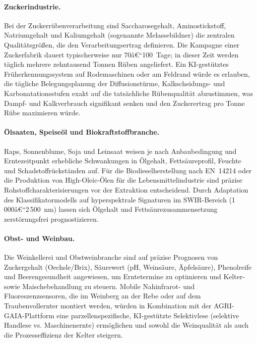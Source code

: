 ﻿\documentclass[12pt,a4paper]{article}
\theoremstyle{plain}
\theoremstyle{definition}
\begin{document}
	\paragraph{Zuckerindustrie.}
	Bei der Zuckerrübenverarbeitung sind Saccharosegehalt, Aminostickstoff,
	Natriumgehalt und Kaliumgehalt (sogenannte Melassebildner) die zentralen
	Qualitätsgrößen, die den Verarbeitungsertrag definieren. Die Kampagne einer
	Zuckerfabrik dauert typischerweise nur 70â€“100~Tage; in dieser Zeit werden
	täglich mehrere zehntausend Tonnen Rüben angeliefert. Ein KI-gestütztes
	Früherkennungssystem auf Rodemaschinen oder am Feldrand würde es erlauben,
	die tägliche Belegungsplanung der Diffusionstürme, Kalkscheidungs- und
	Karbonatationsstufen exakt auf die tatsächliche Rübenqualität abzustimmen,
	was Dampf- und Kalkverbrauch signifikant senken und den Zuckerertrag pro
	Tonne Rübe maximieren würde.

	\paragraph{Ölsaaten, Speiseöl und Biokraftstoffbranche.}
	Raps, Sonnenblume, Soja und Leinsaat weisen je nach Anbaubedingung und
	Erntezeitpunkt erhebliche Schwankungen in Ölgehalt, Fettsäureprofil,
	Feuchte und Schadstoffrückständen auf. Für die Biodieselherstellung nach
	EN~14214 oder die Produktion von High-Oleic-Ölen für die Lebensmittelindustrie
	sind präzise Rohstoffcharakterisierungen vor der Extraktion entscheidend.
	Durch Adaptation des Klassifikatormodells auf hyperspektrale Signaturen im
	SWIR-Bereich (1\,000â€“2\,500~nm) lassen sich Ölgehalt und Fettsäurezusammensetzung
	zerstörungsfrei prognostizieren.

	\paragraph{Obst- und Weinbau.}
	Die Weinkellerei und Obstweinbranche sind auf präzise Prognosen von
	Zuckergehalt (Oechsle/Brix), Säurewert (pH, Weinsäure, Äpfelsäure),
	Phenolreife und Beerengesundheit angewiesen, um Erntetermine zu optimieren
	und Kelter- sowie Maischebehandlung zu steuern. Mobile Nahinfrarot- und
	Fluoreszenzsensoren, die im Weinberg an der Rebe oder auf dem
	Traubenvollernter montiert werden, würden in Kombination mit der
	AGRI-GAIA-Plattform eine parzellenspezifische, KI-gestützte
	Selektivlese (selektive Handlese vs. Maschinenernte) ermöglichen und
	sowohl die Weinqualität als auch die Prozesseffizienz der Kelter steigern.
\end{document}
